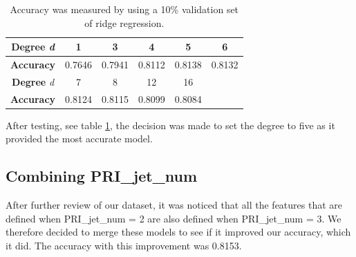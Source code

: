 \documentclass[10pt,conference,compsocconf]{IEEEtran}
\begin{document}
\begin{table}[t]
\caption{Accuracy was measured by using a 10\% validation set of ridge regression.}
\begin{tabular}{|c|c|c|c|c|l}
\hline
\textbf{Degree} \textit{d}   & 1      & 3      & 4      & 5      & \multicolumn{1}{c|}{6}      \\ \hline
\textbf{Accuracy} & 0.7646 & 0.7941 & 0.8112 & 0.8138 & \multicolumn{1}{c|}{0.8132} \\ \hline 
\textbf{Degree} \textit{d}   & 7      & 8      & 12     & 16     &                             \\ \cline{1-5}
\textbf{Accuracy} & 0.8124 & 0.8115 & 0.8099 & 0.8084 &                             \\ \cline{1-5}
\end{tabular}
\centering
\label{accuracy}
\end{table}

After testing, see table \ref{accuracy}, the decision was made to set the degree to five as it provided the most accurate model.

\subsection{Combining PRI\_jet\_num }

After further review of our dataset, it was noticed that all the features that are defined when PRI\_jet\_num = 2 are also defined when PRI\_jet\_num = 3.
We therefore decided to merge these models to see if it improved our accuracy, which it did. The accuracy with this improvement was 0.8153.
\end{document}
